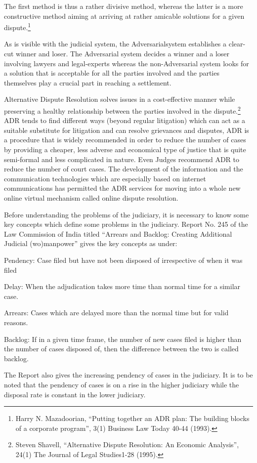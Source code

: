 \begin{multicols}{2}
\noi
The first method is thus a rather divisive method, whereas the latter is a more constructive
method aiming at arriving at rather amicable solutions for a given dispute.\footnote{ Harry N. Mazadoorian, “Putting together an ADR plan: The building blocks of a corporate program”, 3(1)
Business Law Today 40-44 (1993).}

\noi
As is visible with the judicial system, the Adversarialsystem establishes a clear-cut winner and
loser. The Adversarial system decides a winner and a loser involving lawyers and legal-experts
whereas the non-Adversarial system looks for a solution that is acceptable for all the parties
involved and the parties themselves play a crucial part in reaching a settlement.

\noi
Alternative Dispute Resolution solves issues in a cost-effective manner while preserving a
healthy relationship between the parties involved in the dispute.\footnote{Steven Shavell, “Alternative Dispute Resolution: An Economic Analysis”, 24(1) The Journal of Legal Studies1-28 (1995).} ADR tends to find different ways (beyond regular litigation) which can act as a suitable substitute for litigation and can resolve grievances and disputes, ADR is a procedure that is widely recommended in order to
reduce the number of cases by providing a cheaper, less adverse and economical type of justice
that is quite semi-formal and less complicated in nature. Even Judges recommend ADR to
reduce the number of court cases. The development of the information and the
communication technologies which are especially based on internet communications has
permitted the ADR services for moving into a whole new online virtual mechanism called
online dispute resolution.


\noi
Before understanding the problems of the judiciary, it is necessary to know some key concepts
which define some problems in the judiciary. Report No. 245 of the Law Commission of India
titled “Arrears and Backlog: Creating Additional Judicial (wo)manpower” gives the key
concepts as under:

\noi
Pendency: Case filed but have not been disposed of irrespective of when it was filed

\noi
Delay: When the adjudication takes more time than normal time for a similar case.

\noi
Arrears: Cases which are delayed more than the normal time but for valid reasons.

\noi
Backlog: If in a given time frame, the number of new cases filed is higher than the number of
cases disposed of, then the difference between the two is called backlog.

\noi
The Report also gives the increasing pendency of cases in the judiciary. It is to be noted that
the pendency of cases is on a rise in the higher judiciary while the disposal rate is constant in
the lower judiciary.
\end{multicols}

